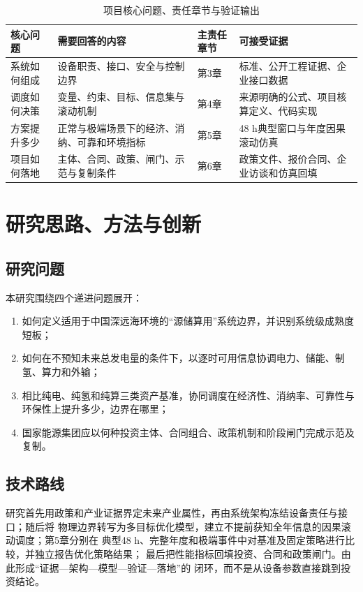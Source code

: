 \begin{table}[H]
\centering
\caption{项目核心问题、责任章节与验证输出}
\label{tab:c1-question-map}
\begin{tabularx}{\textwidth}{p{2.2cm} X p{2.5cm} p{3.2cm}}
\toprule
核心问题 & 需要回答的内容 & 主责任章节 & 可接受证据\\
\midrule
系统如何组成 & 设备职责、接口、安全与控制边界 & 第3章 & 标准、公开工程证据、企业接口数据\\
调度如何决策 & 变量、约束、目标、信息集与滚动机制 & 第4章 & 来源明确的公式、项目核算定义、代码实现\\
方案提升多少 & 正常与极端场景下的经济、消纳、可靠和环境指标 & 第5章 & 48 h典型窗口与年度因果滚动仿真\\
项目如何落地 & 主体、合同、政策、闸门、示范与复制条件 & 第6章 & 政策文件、报价合同、企业访谈和仿真回填\\
\bottomrule
\end{tabularx}
\end{table}

\section{研究思路、方法与创新}

\subsection{研究问题}

本研究围绕四个递进问题展开：
\begin{enumerate}
  \item 如何定义适用于中国深远海环境的“源储算用”系统边界，并识别系统级成熟度短板；
  \item 如何在不预知未来总发电量的条件下，以逐时可用信息协调电力、储能、制氢、算力和外输；
  \item 相比纯电、纯氢和纯算三类资产基准，协同调度在经济性、消纳率、可靠性与环保性上提升多少，边界在哪里；
  \item 国家能源集团应以何种投资主体、合同组合、政策机制和阶段闸门完成示范及复制。
\end{enumerate}

\subsection{技术路线}

研究首先用政策和产业证据界定未来产业属性，再由系统架构冻结设备责任与接口；随后将
物理边界转写为多目标优化模型，建立不提前获知全年信息的因果滚动调度；第5章分别在
典型48 h、完整年度和极端事件中对基准及固定策略进行比较，并独立报告优化策略结果；
最后把性能指标回填投资、合同和政策闸门。由此形成“证据—架构—模型—验证—落地”的
闭环，而不是从设备参数直接跳到投资结论。

